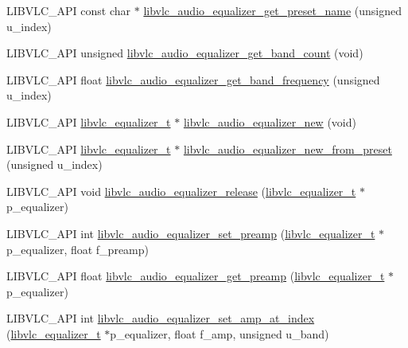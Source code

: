 \begin{DoxyCompactItemize}
\item 
L\+I\+B\+V\+L\+C\+\_\+\+A\+PI const char $\ast$ \hyperlink{group__libvlc__audio_ga6d49eeb9252e31111054b2154ce54ced}{libvlc\+\_\+audio\+\_\+equalizer\+\_\+get\+\_\+preset\+\_\+name} (unsigned u\+\_\+index)
\item 
L\+I\+B\+V\+L\+C\+\_\+\+A\+PI unsigned \hyperlink{group__libvlc__audio_ga28ddee836a9398d91d5267831a46f1aa}{libvlc\+\_\+audio\+\_\+equalizer\+\_\+get\+\_\+band\+\_\+count} (void)
\item 
L\+I\+B\+V\+L\+C\+\_\+\+A\+PI float \hyperlink{group__libvlc__audio_ga4dd31672321d9e2656ca32681d8cdbe6}{libvlc\+\_\+audio\+\_\+equalizer\+\_\+get\+\_\+band\+\_\+frequency} (unsigned u\+\_\+index)
\item 
L\+I\+B\+V\+L\+C\+\_\+\+A\+PI \hyperlink{group__libvlc__media__player_ga1ea141a84d68d0147fc58d99bfc83ab7}{libvlc\+\_\+equalizer\+\_\+t} $\ast$ \hyperlink{group__libvlc__audio_gad252fff10bf02bc8436b3beab4badef9}{libvlc\+\_\+audio\+\_\+equalizer\+\_\+new} (void)
\item 
L\+I\+B\+V\+L\+C\+\_\+\+A\+PI \hyperlink{group__libvlc__media__player_ga1ea141a84d68d0147fc58d99bfc83ab7}{libvlc\+\_\+equalizer\+\_\+t} $\ast$ \hyperlink{group__libvlc__audio_ga41d6921b8a10f90c4ad9fd3bf844f035}{libvlc\+\_\+audio\+\_\+equalizer\+\_\+new\+\_\+from\+\_\+preset} (unsigned u\+\_\+index)
\item 
L\+I\+B\+V\+L\+C\+\_\+\+A\+PI void \hyperlink{group__libvlc__audio_gae574f86a29c7dbe9eeb1f3d397262e55}{libvlc\+\_\+audio\+\_\+equalizer\+\_\+release} (\hyperlink{group__libvlc__media__player_ga1ea141a84d68d0147fc58d99bfc83ab7}{libvlc\+\_\+equalizer\+\_\+t} $\ast$p\+\_\+equalizer)
\item 
L\+I\+B\+V\+L\+C\+\_\+\+A\+PI int \hyperlink{group__libvlc__audio_ga3830180c636eee2903517d89d6b57616}{libvlc\+\_\+audio\+\_\+equalizer\+\_\+set\+\_\+preamp} (\hyperlink{group__libvlc__media__player_ga1ea141a84d68d0147fc58d99bfc83ab7}{libvlc\+\_\+equalizer\+\_\+t} $\ast$p\+\_\+equalizer, float f\+\_\+preamp)
\item 
L\+I\+B\+V\+L\+C\+\_\+\+A\+PI float \hyperlink{group__libvlc__audio_ga4ed1997fdc55963df5c7ae26c3ffa735}{libvlc\+\_\+audio\+\_\+equalizer\+\_\+get\+\_\+preamp} (\hyperlink{group__libvlc__media__player_ga1ea141a84d68d0147fc58d99bfc83ab7}{libvlc\+\_\+equalizer\+\_\+t} $\ast$p\+\_\+equalizer)
\item 
L\+I\+B\+V\+L\+C\+\_\+\+A\+PI int \hyperlink{group__libvlc__audio_ga619c39485ef5f963be8829bc627326f0}{libvlc\+\_\+audio\+\_\+equalizer\+\_\+set\+\_\+amp\+\_\+at\+\_\+index} (\hyperlink{group__libvlc__media__player_ga1ea141a84d68d0147fc58d99bfc83ab7}{libvlc\+\_\+equalizer\+\_\+t} $\ast$p\+\_\+equalizer, float f\+\_\+amp, unsigned u\+\_\+band)

\end{DoxyCompactItemize}
